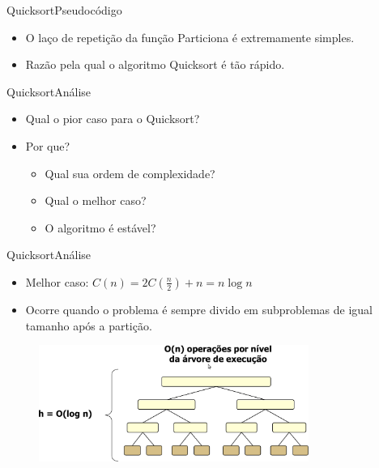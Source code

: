 \documentclass[aspectratio=169]{beamer}
\begin{document}
\begin{frame}{Quicksort}{Pseudocódigo}
\begin{itemize}
\item O laço de repetição da função Particiona é extremamente simples.
\item Razão pela qual o algoritmo Quicksort é tão rápido.
\end{itemize}
\end{frame}


\begin{frame}{Quicksort}{Análise}
\begin{itemize}
\item Qual o pior caso para o Quicksort?
\item Por que?
\begin{itemize}
\item Qual sua ordem de complexidade?
\item Qual o melhor caso?
\item O algoritmo é estável?
\end{itemize}
\end{itemize}
\end{frame}



\begin{frame}{Quicksort}{Análise}
\begin{itemize}
\item Melhor caso: $C(n) = 2C(\frac{n}{2}) + n = n \log n$
\item Ocorre quando o problema é sempre divido em subproblemas de igual tamanho após a partição.
\end{itemize}
\begin{figure}[!h]
  \centering
  \includegraphics[width=250pt]{imgs/analise_quicksort_melhorcaso.png}
  \label{fig_analise_quicksort_melhorcaso}
\end{figure} 
\end{frame}

\end{document}
